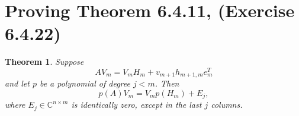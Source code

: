 \documentclass[10pt,letterpaper]{article}
\newtheorem{thm}{Theorem}
\begin{document}
\section{Proving Theorem 6.4.11, (Exercise 6.4.22)}
\begin{thm}
    Suppose
    \begin{equation*}
        AV_m = V_mH_m + v_{m+1}h_{m+1,m}e_m^T
    \end{equation*}
    and let $p$ be a polynomial of degree $j < m$.  Then
    \begin{equation}
        p(A)V_m = V_mp(H_m) + E_j,
        \label{eq:ArnoldiPolynomial}
    \end{equation}
    where $E_j \in \mathbb{C}^{n \times m}$ is identically zero, except in the last $j$ columns.
    \label{thm:First}
\end{thm}
\end{document}
